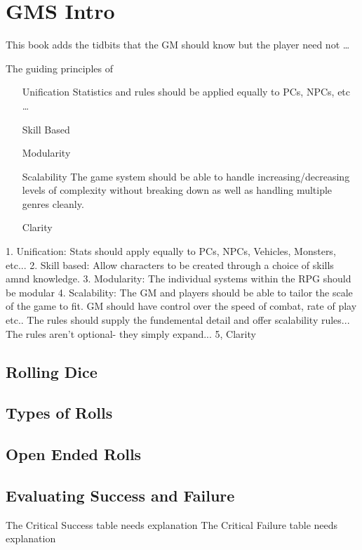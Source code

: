 \chapter{GMS Intro}

This book adds the tidbits that the GM should know but the 
player need not \dots

The guiding principles of \SH\ 

\begin{enumerate}
\item[Unification] Statistics and rules should be applied equally to
PCs, NPCs, etc \dots
\item[Skill Based] 
\item[Modularity]
\item[Scalability] The game system should be able to handle 
increasing/decreasing levels of complexity without breaking down
as well as handling multiple genres cleanly.
\item[Clarity]
\end{enumerate}

1. Unification: Stats should apply equally to PCs, NPCs, Vehicles, Monsters, etc...
2. Skill based: Allow characters to be created through a choice of skills amnd
knowledge.
3. Modularity: The individual systems within the RPG should be modular
4. Scalability: The GM and players should be able to tailor the scale
of the game to fit. GM should have control over the speed of combat,
rate of play etc.. The rules should supply the fundemental detail
and offer scalability rules... The rules aren't optional- they simply
expand...
5, Clarity

\section{Rolling Dice}

\section{Types of Rolls}

\section{Open Ended Rolls}

\section{Evaluating Success and Failure}

The Critical Success table needs explanation
The Critical Failure table needs explanation
